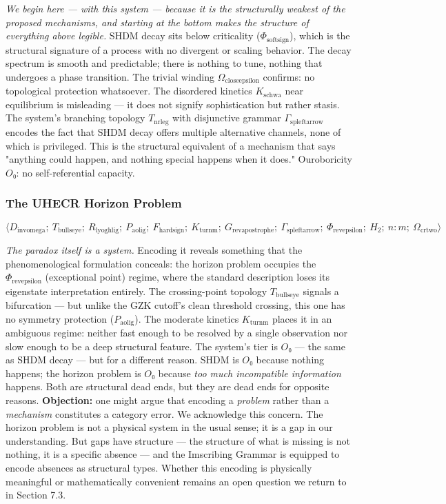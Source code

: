 \documentclass[12pt,a4paper]{article}
\begin{document}
\emph{We begin here --- with this system --- because it is the structurally weakest of the proposed mechanisms, and starting at the bottom makes the structure of everything above legible.} SHDM decay sits below criticality ($\Phi_{\text{softsign}}$), which is the structural signature of a process with no divergent or scaling behavior. The decay spectrum is smooth and predictable; there is nothing to tune, nothing that undergoes a phase transition. The trivial winding $\Omega_{\text{closeepsilon}}$ confirms: no topological protection whatsoever. The disordered kinetics $K_{\text{schwa}}$ near equilibrium is misleading --- it does not signify sophistication but rather stasis. The system's branching topology $T_{\text{nrleg}}$ with disjunctive grammar $\Gamma_{\text{spleftarrow}}$ encodes the fact that SHDM decay offers multiple alternative channels, none of which is privileged. This is the structural equivalent of a mechanism that says "anything could happen, and nothing special happens when it does." Ouroboricity $O₀$: no self-referential capacity.

\subsubsection{The UHECR Horizon Problem}

\[\langle D_{\text{invomega}};\ T_{\text{bullseye}};\ R_{\text{lyoghlig}};\ P_{\text{aolig}};\ F_{\text{hardsign}};\ K_{\text{turnm}};\ G_{\text{revapostrophe}};\ \Gamma_{\text{spleftarrow}};\ \Phi_{\text{revepsilon}};\ H_2;\ n{:}m;\ \Omega_{\text{crtwo}} \rangle\]

\emph{The paradox itself is a system.} Encoding it reveals something that the phenomenological formulation conceals: the horizon problem occupies the $\Phi_{\text{revepsilon}}$ (exceptional point) regime, where the standard description loses its eigenstate interpretation entirely. The crossing-point topology $T_{\text{bullseye}}$ signals a bifurcation --- but unlike the GZK cutoff's clean threshold crossing, this one has no symmetry protection ($P_{\text{aolig}}$). The moderate kinetics $K_{\text{turnm}}$ places it in an ambiguous regime: neither fast enough to be resolved by a single observation nor slow enough to be a deep structural feature. The system's tier is $O₀$ --- the same as SHDM decay --- but for a different reason. SHDM is $O₀$ because nothing happens; the horizon problem is $O₀$ because \emph{too much incompatible information} happens. Both are structural dead ends, but they are dead ends for opposite reasons. \textbf{Objection:} one might argue that encoding a \emph{problem} rather than a \emph{mechanism} constitutes a category error. We acknowledge this concern. The horizon problem is not a physical system in the usual sense; it is a gap in our understanding. But gaps have structure --- the structure of what is missing is not nothing, it is a specific absence --- and the Imscribing Grammar is equipped to encode absences as structural types. Whether this encoding is physically meaningful or mathematically convenient remains an open question we return to in Section 7.3.
\end{document}
